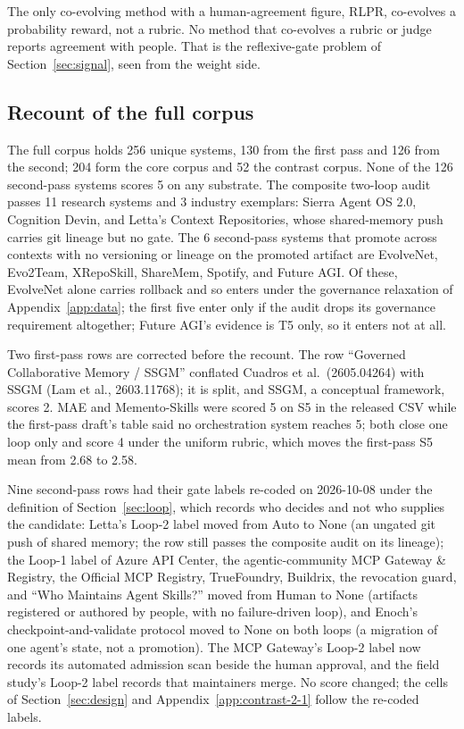 \documentclass[
  11pt,
]{article}
\begin{document}
The only co-evolving method with a human-agreement figure, RLPR, co-evolves a probability reward, not a rubric. No method that co-evolves a rubric or judge reports agreement with people. That is the reflexive-gate problem of Section~\ref{sec:signal}, seen from the weight side.

\subsection{Recount of the full corpus}\label{app:audit-7}

The full corpus holds 256 unique systems, 130 from the first pass and 126 from the second; 204 form the core corpus and 52 the contrast corpus. None of the 126 second-pass systems scores 5 on any substrate. The composite two-loop audit passes 11 research systems and 3 industry exemplars: Sierra Agent OS 2.0, Cognition Devin, and Letta's Context Repositories, whose shared-memory push carries git lineage but no gate. The 6 second-pass systems that promote across contexts with no versioning or lineage on the promoted artifact are EvolveNet, Evo2Team, XRepoSkill, ShareMem, Spotify, and Future AGI. Of these, EvolveNet alone carries rollback and so enters under the governance relaxation of Appendix~\ref{app:data}; the first five enter only if the audit drops its governance requirement altogether; Future AGI's evidence is T5 only, so it enters not at all.

Two first-pass rows are corrected before the recount. The row ``Governed Collaborative Memory / SSGM'' conflated Cuadros et al.~(2605.04264) with SSGM (Lam et al., 2603.11768); it is split, and SSGM, a conceptual framework, scores 2. MAE and Memento-Skills were scored 5 on S5 in the released CSV while the first-pass draft's table said no orchestration system reaches 5; both close one loop only and score 4 under the uniform rubric, which moves the first-pass S5 mean from 2.68 to 2.58.

Nine second-pass rows had their gate labels re-coded on 2026-10-08 under the definition of Section~\ref{sec:loop}, which records who decides and not who supplies the candidate: Letta's Loop-2 label moved from Auto to None (an ungated git push of shared memory; the row still passes the composite audit on its lineage); the Loop-1 label of Azure API Center, the agentic-community MCP Gateway \& Registry, the Official MCP Registry, TrueFoundry, Buildrix, the revocation guard, and ``Who Maintains Agent Skills?'' moved from Human to None (artifacts registered or authored by people, with no failure-driven loop), and Enoch's checkpoint-and-validate protocol moved to None on both loops (a migration of one agent's state, not a promotion). The MCP Gateway's Loop-2 label now records its automated admission scan beside the human approval, and the field study's Loop-2 label records that maintainers merge. No score changed; the cells of Section~\ref{sec:design} and Appendix~\ref{app:contrast-2-1} follow the re-coded labels.
\end{document}

